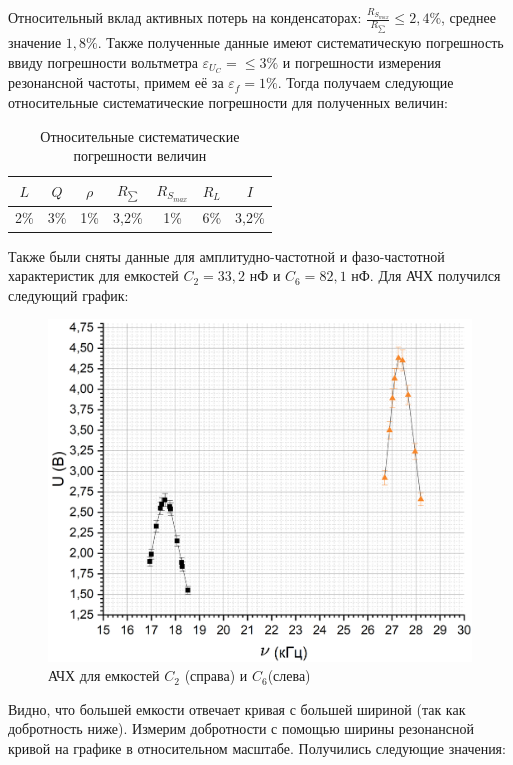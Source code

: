 \documentclass[a4paper, 12pt]{article}
\begin{document}
	Относительный вклад активных потерь на конденсаторах: $\frac{R_{S_{max}}}{R_{\sum}} \leq 2,4 \% $, среднее значение $1,8 \%$. Также полученные данные имеют систематическую погрешность ввиду погрешности вольтметра $\varepsilon_{U_C} = \leq 3\%$ и погрешности измерения резонансной частоты, примем её за $\varepsilon_f = 1 \%$. Тогда получаем следующие относительные систематические погрешности для полученных величин:
	\begin{table}[h!]
		\centering
		\begin{tabular}{|c|c|c|c|c|c|c|}
			\hline
			$L$ & $Q$ & $\rho$ & $R_{\sum}$ & $R_{S_{max}}$ & $R_L$ & $I$ \\ \hline
			2\% & 3\% & 1\% & 3,2\% & 1\% & 6\% & 3,2\% \\ \hline
		\end{tabular}
		\caption{Относительные систематические погрешности величин}
	\end{table}
	
	Также были сняты данные для амплитудно-частотной и фазо-частотной характеристик для емкостей $C_2 = 33,2$ нФ и $C_6 = 82,1$ нФ. Для АЧХ получился следующий график:
	
	\begin{figure}[h]
		\includegraphics[width = \textwidth]{2AFCH}
		\caption{АЧХ для емкостей $C_2$ (справа) и $C_6$(слева)}
	\end{figure}
	
	Видно, что большей емкости отвечает кривая с большей шириной (так как добротность ниже). Измерим добротности с помощью ширины резонансной кривой на графике в относительном масштабе. Получились следующие значения:
	
\end{document}
